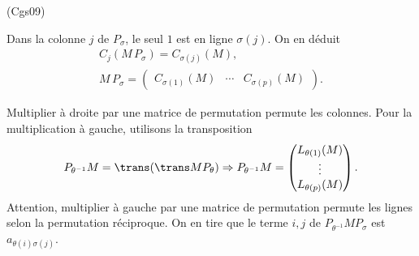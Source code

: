 \begin{tiny}(Cgs09)\end{tiny} Dans la colonne $j$ de $P_{\sigma}$, le seul $1$ est en ligne $\sigma(j)$. On en déduit
\begin{multline*}
 C_j(M\, P_{\sigma}) = C_{\sigma(j)}(M), \\
 M\, P_{\sigma} = 
 \begin{pmatrix}
  C_{\sigma(1)}(M) & \cdots & C_{\sigma(p)}(M)
 \end{pmatrix}.
\end{multline*}

Multiplier à droite par une matrice de permutation permute les colonnes.
Pour la multiplication à gauche, utilisons la transposition
\[
 P_{\theta^{-1}} M = \trans (\trans M P_{\theta}) 
 \Rightarrow P_{\theta^{-1}} M = 
 \begin{pmatrix}
  L_{\theta(1)}(M) \\ \vdots \\ L_{\theta(p)}(M)
 \end{pmatrix} .
\]
Attention, multiplier à gauche par une matrice de permutation permute les lignes selon la permutation réciproque.\newline
On en tire que le terme $i,j$ de $P_{\theta^{-1}} M P_{\sigma}$ est $a_{\theta(i) \sigma(j)}$.
